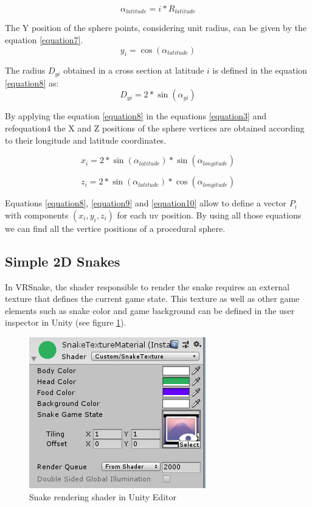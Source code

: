 \documentclass[runningheads]{llncs}
\begin{document}
\begin{equation}
\alpha_{latitude} = i * R_{latitude}
\label{equation6}
\end{equation}

The Y position of the sphere points, considering unit radius, can be given by the equation \ref{equation7}.
\begin{equation}
y_{i} = \cos(\alpha_{latitude})
\label{equation7}
\end{equation}

The radius $D_{yi}$ obtained in a cross section at latitude $i$ is defined in the equation \ref{equation8} as:
\begin{equation}
D_{yi} = 2 * \sin(\alpha_{yi})
\label{equation8}
\end{equation}

By applying the equation \ref{equation8} in the equations \ref{equation3} and ref{equation4} the X and Z positions of the sphere vertices are obtained according to their longitude and latitude coordinates.

\begin{equation}
x_{i} = 2 * \sin(\alpha_{latitude}) * \sin(\alpha_{longitude})
\label{equation9}
\end{equation}

\begin{equation}
z_{i} = 2 * \sin(\alpha_{latitude}) * \cos(\alpha_{longitude})
\label{equation10}
\end{equation}

Equations \ref{equation8}, \ref{equation9} and \ref{equation10} allow to define a vector $P_i$ with components $(x_i, y_i, z_i)$ for each uv position. By using all those equations we can find all the vertice positions of a procedural sphere.

\subsection{Simple 2D Snakes}
\label{subsec:2d-snakes}
In VRSnake, the shader responsible to render the snake requires an external texture that defines the current game state. This texture as well as other game elements such as snake color and game background can be defined in the user inspector in Unity (see figure \ref{fig:snake_editor_unity}).

\begin{figure}[!h]
    \centering
    \includegraphics[scale=1]{src/hci2020-images/SnakeTextureMaterial.png}
    \caption{Snake rendering shader in Unity Editor}
    \label{fig:snake_editor_unity}
\end{figure}
\end{document}
